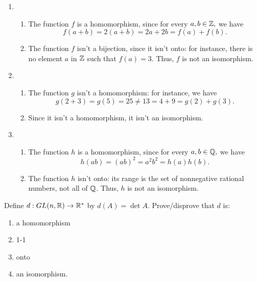 \begin{solution}[print=false]
\begin{enumerate}

\item \begin{enumerate}
\item
The function $f$ is a homomorphism, since for every $a,b \in
    \mathbb{Z},$ we have
$$f(a+b)=2(a+b)=2a+2b=f(a)+f(b).$$ \item The function $f$ isn't a bijection, since it isn't onto: for instance, there is
no element $a$ in $\mathbb{Z}$ such that $f(a)=3$. Thus, $f$ is not an
isomorphism.
\end{enumerate}


\item \begin{enumerate}
\item The function $g$ isn't a homomorphism: for instance, we have $$g(2+3)=g(5)=25\neq 13=4+9=g(2)+g(3).$$ \item Since it isn't a homomorphism, it isn't an isomorphism.
\end{enumerate}

\item \begin{enumerate}
\item  The function $h$ is a homomorphism, since for every $a,b \in
    \mathbb{Q},$ we have
$$h(ab)=(ab)^2=a^2b^2=h(a)h(b).$$ \item The function $h$ isn't onto: its range is the set of nonnegative rational
numbers, not all of $\mathbb{Q}$. Thus, $h$ is not an isomorphism.
  \end{enumerate}

  \end{enumerate}
\end{solution}

\begin{exercise}
Define $d : GL(n,\mathbb{R})\to \mathbb{R}^*$ by $d(A)=\det A$.  Prove/disprove that $d$ is:

  \begin{enumerate}
\item a homomorphism
\item 1-1
\item onto
\item an isomorphism.
  \end{enumerate}
\end{exercise}

